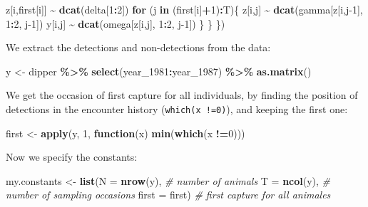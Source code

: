 \documentclass[
  12pt,
]{krantz}
\newenvironment{Shaded}{\begin{snugshade}}{\end{snugshade}}
\newcommand{\AttributeTok}[1]{\textcolor[rgb]{0.13,0.29,0.53}{#1}}
\newcommand{\CommentTok}[1]{\textcolor[rgb]{0.56,0.35,0.01}{\textit{#1}}}
\newcommand{\ControlFlowTok}[1]{\textcolor[rgb]{0.13,0.29,0.53}{\textbf{#1}}}
\newcommand{\DecValTok}[1]{\textcolor[rgb]{0.00,0.00,0.81}{#1}}
\newcommand{\FunctionTok}[1]{\textcolor[rgb]{0.13,0.29,0.53}{\textbf{#1}}}
\newcommand{\NormalTok}[1]{#1}
\newcommand{\OtherTok}[1]{\textcolor[rgb]{0.56,0.35,0.01}{#1}}
\newcommand{\SpecialCharTok}[1]{\textcolor[rgb]{0.81,0.36,0.00}{\textbf{#1}}}
\begin{document}
\begin{Shaded}
\begin{Highlighting}[]
\NormalTok{    z[i,first[i]] }\SpecialCharTok{\textasciitilde{}} \FunctionTok{dcat}\NormalTok{(delta[}\DecValTok{1}\SpecialCharTok{:}\DecValTok{2}\NormalTok{])}
    \ControlFlowTok{for}\NormalTok{ (j }\ControlFlowTok{in}\NormalTok{ (first[i]}\SpecialCharTok{+}\DecValTok{1}\NormalTok{)}\SpecialCharTok{:}\NormalTok{T)\{}
\NormalTok{      z[i,j] }\SpecialCharTok{\textasciitilde{}} \FunctionTok{dcat}\NormalTok{(gamma[z[i,j}\DecValTok{{-}1}\NormalTok{], }\DecValTok{1}\SpecialCharTok{:}\DecValTok{2}\NormalTok{, j}\DecValTok{{-}1}\NormalTok{])}
\NormalTok{      y[i,j] }\SpecialCharTok{\textasciitilde{}} \FunctionTok{dcat}\NormalTok{(omega[z[i,j], }\DecValTok{1}\SpecialCharTok{:}\DecValTok{2}\NormalTok{, j}\DecValTok{{-}1}\NormalTok{])}
\NormalTok{    \}}
\NormalTok{  \}}
\NormalTok{\})}
\end{Highlighting}
\end{Shaded}

We extract the detections and non-detections from the data:

\begin{Shaded}
\begin{Highlighting}[]
\NormalTok{y }\OtherTok{\textless{}{-}}\NormalTok{ dipper }\SpecialCharTok{\%\textgreater{}\%}
  \FunctionTok{select}\NormalTok{(year\_1981}\SpecialCharTok{:}\NormalTok{year\_1987) }\SpecialCharTok{\%\textgreater{}\%}
  \FunctionTok{as.matrix}\NormalTok{()}
\end{Highlighting}
\end{Shaded}

We get the occasion of first capture for all individuals, by finding the position of detections in the encounter history (\texttt{which(x\ !=0)}), and keeping the first one:

\begin{Shaded}
\begin{Highlighting}[]
\NormalTok{first }\OtherTok{\textless{}{-}} \FunctionTok{apply}\NormalTok{(y, }\DecValTok{1}\NormalTok{, }\ControlFlowTok{function}\NormalTok{(x) }\FunctionTok{min}\NormalTok{(}\FunctionTok{which}\NormalTok{(x }\SpecialCharTok{!=}\DecValTok{0}\NormalTok{)))}
\end{Highlighting}
\end{Shaded}

Now we specify the constants:

\begin{Shaded}
\begin{Highlighting}[]
\NormalTok{my.constants }\OtherTok{\textless{}{-}} \FunctionTok{list}\NormalTok{(}\AttributeTok{N =} \FunctionTok{nrow}\NormalTok{(y),   }\CommentTok{\# number of animals}
                     \AttributeTok{T =} \FunctionTok{ncol}\NormalTok{(y),   }\CommentTok{\# number of sampling occasions}
                     \AttributeTok{first =}\NormalTok{ first) }\CommentTok{\# first capture for all animales}
\end{Highlighting}
\end{Shaded}
\end{document}
